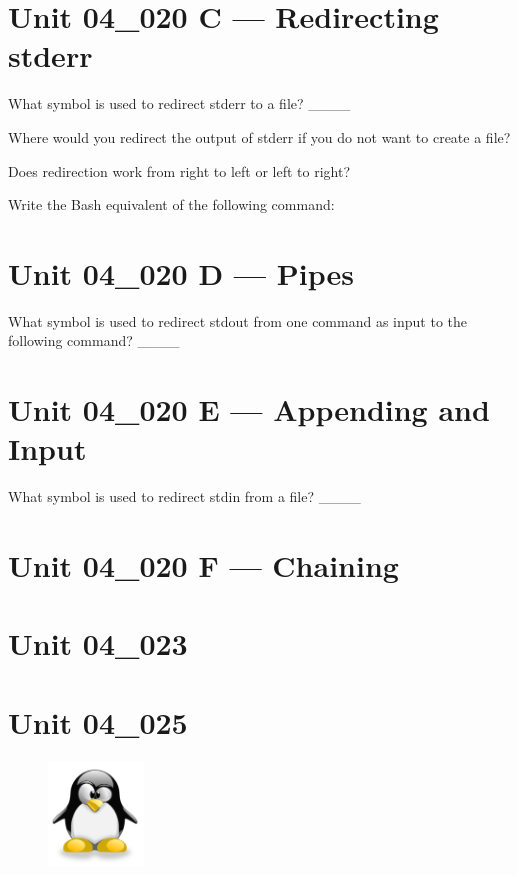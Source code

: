 \documentclass[letterpaper,12pt]{exam}
\newcommand{\unit}{Unit 04}
\begin{document}
\begin {questions}
\section*{\unit\_020 C --- Redirecting stderr} %

\question What symbol is used to redirect stderr to a file? \_\_\_\_

\question Where would you redirect the output of stderr if you do not want to create a file?

\question Does redirection work from right to left or left to right?

\question Write the Bash equivalent of the following command:\newline
\centerline{}
\vspace{5mm}

\section*{\unit\_020 D --- Pipes}

\question What symbol is used to redirect stdout from one command as input to the following command? \_\_\_\_




\section*{\unit\_020 E --- Appending and Input} %
\question What symbol is used to redirect stdin from a file? \_\_\_\_

\section*{\unit\_020 F --- Chaining} %

\section*{\unit\_023} %

\section*{\unit\_025} %


\end{questions}
\begin{figure}[b]\label{end}
	\center
	\includegraphics[width=1in]{tux}
	{}
\end{figure}
\end{document}

